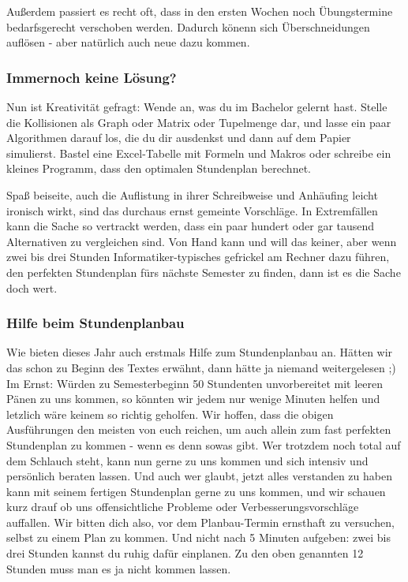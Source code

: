 \begin{multicols}{2}
Außerdem passiert es recht oft, dass in den ersten Wochen noch Übungstermine bedarfsgerecht verschoben werden. Dadurch könenn sich Überschneidungen auflösen - aber natürlich auch neue dazu kommen.

\subsubsection{Immernoch keine Lösung?}
Nun ist Kreativität gefragt: Wende an, was du im Bachelor gelernt hast. Stelle die Kollisionen als Graph oder Matrix oder Tupelmenge dar, und lasse ein paar Algorithmen darauf los, die du dir ausdenkst und dann auf dem Papier simulierst. Bastel eine Excel-Tabelle mit Formeln und Makros oder schreibe ein kleines Programm, dass den optimalen Stundenplan berechnet. 

Spaß beiseite, auch die Auflistung in ihrer Schreibweise und Anhäufing leicht ironisch wirkt, sind das durchaus ernst gemeinte Vorschläge. In Extremfällen kann die Sache so vertrackt werden, dass ein paar hundert oder gar tausend Alternativen zu vergleichen sind. Von Hand kann und will das keiner, aber wenn zwei bis drei Stunden Informatiker-typisches gefrickel am Rechner dazu führen, den perfekten Stundenplan fürs nächste Semester zu finden, dann ist es die Sache doch wert.

\subsubsection{Hilfe beim Stundenplanbau}
Wie bieten dieses Jahr auch erstmals Hilfe zum Stundenplanbau an. Hätten wir das schon zu Beginn des Textes erwähnt, dann hätte ja niemand weitergelesen ;) Im Ernst: Würden zu Semesterbeginn 50 Stundenten unvorbereitet mit leeren Pänen zu uns kommen, so könnten wir jedem nur wenige Minuten helfen und letzlich wäre keinem so richtig geholfen. Wir hoffen, dass die obigen Ausführungen den meisten von euch reichen, um auch allein zum fast perfekten Stundenplan zu kommen - wenn es denn sowas gibt. Wer trotzdem noch total auf dem Schlauch steht, kann nun gerne zu uns kommen und sich intensiv und persönlich beraten lassen. Und auch wer glaubt, jetzt alles verstanden zu haben kann mit seinem fertigen Stundenplan gerne zu uns kommen, und wir schauen kurz drauf ob uns offensichtliche Probleme oder Verbesserungsvorschläge auffallen. Wir bitten dich also, vor dem Planbau-Termin ernsthaft zu versuchen, selbst zu einem Plan zu kommen. Und nicht nach 5 Minuten aufgeben: zwei bis drei Stunden kannst du ruhig dafür einplanen. Zu den oben genannten 12 Stunden muss man es ja nicht kommen lassen.


\end{multicols}
